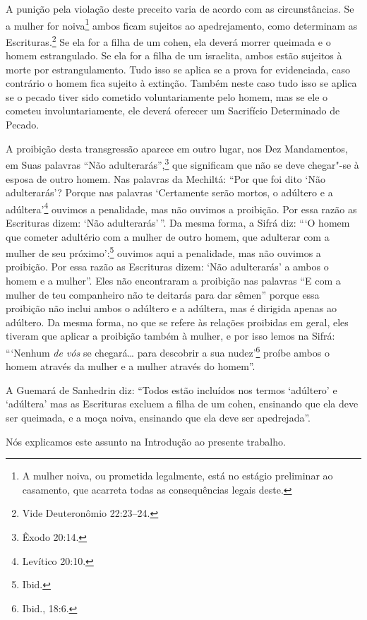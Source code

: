 \begin{multicols}{2}
A punição pela violação deste preceito varia de acordo com as
circunstâncias. Se a mulher for noiva\footnote{A mulher noiva, ou prometida legalmente, está no estágio preliminar ao casamento, que acarreta todas as consequências legais deste.} ambos ficam
sujeitos ao apedrejamento, como determinam as
Escrituras.\footnote{Vide Deuteronômio 22:23--24.} Se ela for a filha de um cohen\starr,
ela deverá morrer queimada e o homem estrangulado. Se ela for a filha de
um israelita, ambos estão sujeitos à morte por estrangulamento. Tudo
isso se aplica se a prova for evidenciada, caso contrário o homem fica
sujeito à extinção. Também neste caso tudo isso se aplica se o pecado
tiver sido cometido voluntariamente pelo homem, mas se ele o cometeu
involuntariamente, ele deverá oferecer um Sacrifício Determinado de
Pecado.

A proibição desta transgressão aparece em outro lugar, nos Dez
Mandamentos, em Suas palavras ``Não adulterarás'',\footnote{Êxodo 20:14.} que
significam que não se deve chegar"-se à esposa de outro homem. Nas
palavras da Mechiltá\starr: ``Por que foi dito `Não adulterarás'? Porque nas
palavras `Certamente serão mortos, o adúltero e a adúltera'\footnote{Levítico
20:10.} ouvimos a penalidade, mas não ouvimos a proibição. Por essa razão
as Escrituras dizem: `Não adulterarás'\,''. Da mesma forma, a Sifrá\starr{} diz:
```O homem que cometer adultério com a mulher de outro homem, que
adulterar com a mulher de seu próximo':\footnote{Ibid.} ouvimos aqui a
penalidade, mas não ouvimos a proibição. Por essa razão as Escrituras
dizem: `Não adulterarás' a ambos o homem e a mulher''. Eles não
encontraram a proibição nas palavras ``E com a mulher de teu
companheiro não te deitarás para dar sêmen'' porque essa proibição não
inclui ambos o adúltero e a adúltera, mas é dirigida apenas ao adúltero.
Da mesma forma, no que se refere às relações proibidas em geral, eles
tiveram que aplicar a proibição também à mulher, e por isso lemos na
Sifrá\starr: ```Nenhum \emph{de vós} se chegará\ldots{} para descobrir a sua
nudez'\footnote{Ibid., 18:6.} proíbe ambos o homem através da mulher e a mulher
através do homem''.

A Guemará\starr{} de Sanhedrin\starr{} diz: ``Todos estão incluídos nos termos
`adúltero' e `adúltera' mas as Escrituras excluem a filha de um cohen\starr,
ensinando que ela deve ser queimada, e a moça noiva, ensinando que ela
deve ser apedrejada''.

Nós explicamos este assunto na Introdução ao presente trabalho.



\end{multicols}
